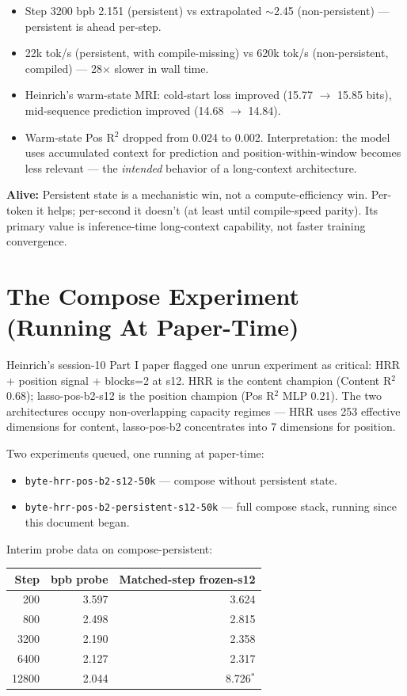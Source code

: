 \documentclass[11pt,a4paper]{report}
\newcommand{\alive}[1]{\textcolor{alive}{\textbf{Alive:}} #1}
\begin{document}
\begin{itemize}[nosep]
\item Step 3200 bpb 2.151 (persistent) vs extrapolated $\sim$2.45 (non-persistent) --- persistent is ahead per-step.
\item 22k tok/s (persistent, with compile-missing) vs 620k tok/s (non-persistent, compiled) --- 28$\times$ slower in wall time.
\item Heinrich's warm-state MRI: cold-start loss improved (15.77 $\to$ 15.85 bits), mid-sequence prediction improved (14.68 $\to$ 14.84).
\item Warm-state Pos R$^2$ dropped from 0.024 to 0.002. Interpretation: the model uses accumulated context for prediction and position-within-window becomes less relevant --- the \emph{intended} behavior of a long-context architecture.
\end{itemize}

\alive{Persistent state is a mechanistic win, not a compute-efficiency win. Per-token it helps; per-second it doesn't (at least until compile-speed parity). Its primary value is inference-time long-context capability, not faster training convergence.}


\chapter{The Compose Experiment (Running At Paper-Time)}

Heinrich's session-10 Part I paper flagged one unrun experiment as critical: HRR + position signal + blocks=2 at s12. HRR is the content champion (Content R$^2$ 0.68); lasso-pos-b2-s12 is the position champion (Pos R$^2$ MLP 0.21). The two architectures occupy non-overlapping capacity regimes --- HRR uses 253 effective dimensions for content, lasso-pos-b2 concentrates into 7 dimensions for position.

Two experiments queued, one running at paper-time:
\begin{itemize}[nosep]
\item \texttt{byte-hrr-pos-b2-s12-50k} --- compose without persistent state.
\item \texttt{byte-hrr-pos-b2-persistent-s12-50k} --- full compose stack, running since this document began.
\end{itemize}

Interim probe data on compose-persistent:

\begin{center}
\begin{tabular}{rrr}
\toprule
Step & bpb probe & Matched-step frozen-s12 \\
\midrule
200 & 3.597 & 3.624 \\
800 & 2.498 & 2.815 \\
3200 & 2.190 & 2.358 \\
6400 & 2.127 & 2.317 \\
12800 & 2.044 & 8.726$^*$ \\
\bottomrule
\end{tabular}
\end{center}
\end{document}
